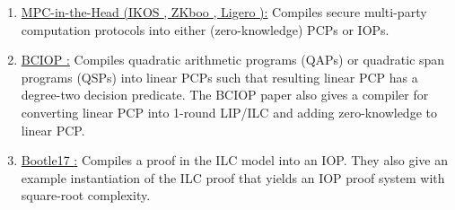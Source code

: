 	\begin{enumerate}[label=\alph*.]
  
	\item \underline{MPC-in-the-Head (IKOS \cite{2007:stoc:ZK-from-SMPC}, ZKboo \cite{2016:Sec:ZKBoo}, Ligero \cite{2017:ccs:ligero}):} 
	Compiles secure \sloppy %
	multi-party computation protocols into either (zero-knowledge) PCPs or IOPs.
  
	\item \underline{BCIOP \cite{2013:tcc:snargs-via-LIPs}:} 
	Compiles quadratic arithmetic programs (QAPs) or quadratic span programs (QSPs) into linear PCPs such that resulting linear PCP has a degree-two decision predicate. 
	The BCIOP paper also gives a compiler for converting linear PCP into 1-round LIP/ILC and adding zero-knowledge to linear PCP.
  
	\item \underline{Bootle17 \cite{2017:asiacrypt:linear-time-zkps-for-arithmetic}:} 
	Compiles a proof in the ILC model into an IOP.
	They also give an example instantiation of the ILC proof that yields an IOP proof system with square-root complexity.
	
	\end{enumerate}

